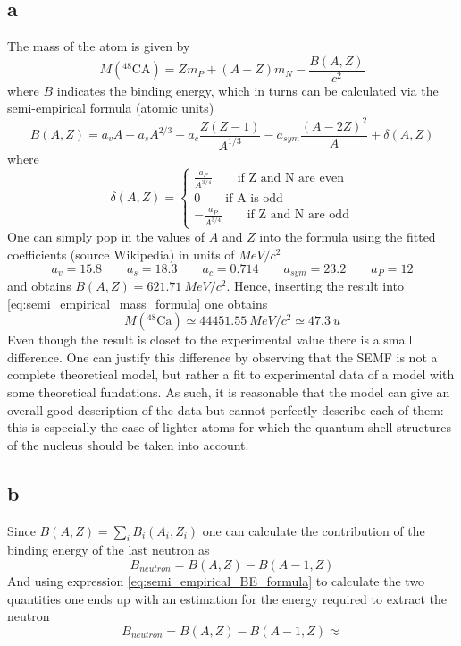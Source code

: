 \subsection*{a}
The mass of the atom is given by
\begin{equation*}
    M(^{48}\text{CA}) = Zm_P + (A-Z)m_N - \frac{B(A, Z)}{c^2}
    \label{eq:semi_empirical_mass_formula}
\end{equation*}
where $B$ indicates the binding energy, which in turns can be calculated via the semi-empirical formula (atomic units)
\begin{equation}
    B(A, Z)= a_v A + a_s A^{2/3} + a_c \frac{Z(Z-1)}{A^{1/3}} - a_{sym} \frac{(A - 2Z)^2}{A} + \delta (A, Z)
    \label{eq:semi_empirical_BE_formula}
\end{equation}
where 
\begin{equation*}
    \delta(A, Z) = 
    \begin{cases}
        \frac{a_P}{A^{3/4}} \qquad \text{if Z and N are even} \\
        0 \qquad \text{if A is odd} \\
        -\frac{a_P}{A^{3/4}} \qquad \text{if Z and N are odd} 
    \end{cases}
\end{equation*}
One can simply pop in the values of $A$ and $Z$ into the formula using the fitted coefficients (source Wikipedia) in units of $MeV/c^2$
\begin{equation*}
    a_v = 15.8 \qquad a_s = 18.3 \qquad a_c = 0.714 \qquad a_{sym} = 23.2 \qquad a_P = 12
\end{equation*}
and obtains $B(A, Z) = 621.71~MeV/c^2$. Hence, inserting the result into \ref{eq:semi_empirical_mass_formula} one obtains
\begin{equation*}
    M(^{48}\text{Ca}) \simeq 44451.55~MeV/c^2 \simeq 47.3~u
\end{equation*}
Even though the result is closet to the experimental value there is a small difference. One can justify this difference by observing that the SEMF is 
not a complete theoretical model, but rather a fit to experimental data of a model with some theoretical fundations. As such, it is reasonable that the model
can give an overall good description of the data but cannot perfectly describe each of them: this is especially the case of lighter atoms for which
the quantum shell structures of the nucleus should be taken into account.

\subsection*{b}
Since $B(A, Z) = \sum_i B_i(A_i, Z_i)$ one can calculate the contribution of the binding energy of the last neutron as 
\begin{equation*}
    B_{neutron} = B(A, Z) - B(A-1, Z)
\end{equation*}
And using expression \ref{eq:semi_empirical_BE_formula} to calculate the two quantities one ends up with an estimation for the energy required to extract the neutron
\begin{equation*}
    B_{neutron} = B(A, Z) - B(A-1, Z) \approx 
\end{equation*}
